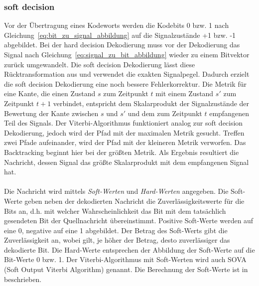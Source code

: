 %				
%				

\subsubsection{soft decision}
\label{kapitel:grundlagen_soft_decision}
Vor der Übertragung eines Kodeworts werden die Kodebits 0 bzw. 1 nach Gleichung~\eqref{eq:bit_zu_signal_abbildung} auf die Signalzustände +1 bzw. -1 abgebildet. Bei der hard decision Dekodierung muss vor der Dekodierung das Signal nach Gleichung~\eqref{eq:signal_zu_bit_abbildung} wieder zu einem Bitvektor zurück umgewandelt. Die soft decision Dekodierung lässt diese Rücktransformation aus und verwendet die exakten Signalpegel. Dadurch erzielt die soft decision Dekodierung eine noch bessere Fehlerkorrektur. Die Metrik für eine Kante, die einen Zustand $s$ zum Zeitpunkt $t$ mit einem Zustand $s'$ zum Zeitpunkt $t+1$ verbindet, entspricht dem Skalarprodukt der Signalzustände der Bewertung der Kante zwischen $s$ und $s'$ und dem zum Zeitpunkt $t$ empfangenen Teil des Signals. Der Viterbi-Algorithmus funktioniert analog zur soft decision Dekodierung, jedoch wird der Pfad mit der maximalen Metrik gesucht. Treffen zwei Pfade aufeinander, wird der Pfad mit der kleineren Metrik verworfen. Das Backtracking beginnt hier bei der größten Metrik. Als Ergebnis resultiert die Nachricht, dessen Signal das größte Skalarprodukt mit dem empfangenen Signal hat.
\\
\\
Die Nachricht wird mittels \emph{Soft-Werten} und \emph{Hard-Werten} angegeben. Die Soft-Werte geben neben der dekodierten Nachricht die Zuverlässigkeitswerte für die Bits an, d.h. mit welcher Wahrscheinlichkeit das Bit mit dem tatsächlich gesendeten Bit der Quellnachricht übereinstimmt. Positive Soft-Werte werden auf eine 0, negative auf eine 1 abgebildet. Der Betrag des Soft-Werts gibt die Zuverlässigkeit an, wobei gilt, je höher der Betrag, desto zuverlässiger das dekodierte Bit. Die Hard-Werte entsprechen der Abbildung der Soft-Werte auf die Bit-Werte 0 bzw. 1. Der Viterbi-Algorithmus mit Soft-Werten wird auch SOVA (Soft Output Viterbi Algorithm) genannt. Die Berechnung der Soft-Werte ist in \cite[S.~228~ff.]{schonfeld2012informations} beschrieben.

